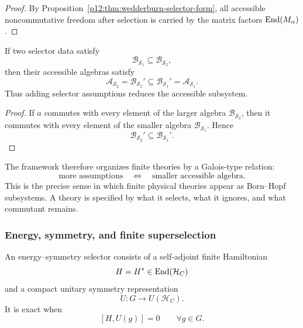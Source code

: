 \documentclass[12pt,a4paper]{article}
\begin{document}
\begin{proof}
By Proposition~\ref{p12:thm:wedderburn-selector-form}, all accessible noncommutative freedom after selection is carried by the matrix factors \(\operatorname{End}(M_\alpha)\).
\end{proof}

\begin{theorem}
\label{p12:thm:order-reversing-selector-lattice}
If two selector data satisfy
\[
\mathcal B_{\mathcal S_1}\subseteq\mathcal B_{\mathcal S_2},
\]
then their accessible algebras satisfy
\begin{equation}
\label{p12:eq:order-reversing-selector}
\mathcal A_{\mathcal S_2}
=
\mathcal B_{\mathcal S_2}'
\subseteq
\mathcal B_{\mathcal S_1}'
=
\mathcal A_{\mathcal S_1}.
\end{equation}
Thus adding selector assumptions reduces the accessible subsystem.
\end{theorem}

\begin{proof}
If \(a\) commutes with every element of the larger algebra \(\mathcal B_{\mathcal S_2}\), then it commutes with every element of the smaller algebra \(\mathcal B_{\mathcal S_1}\).  Hence
\[
\mathcal B_{\mathcal S_2}'\subseteq\mathcal B_{\mathcal S_1}'.
\]
\end{proof}

\begin{remark}
\label{p12:rem:subsystem-logic}
The framework therefore organizes finite theories by a Galois-type relation:
\[
\text{more assumptions}
\quad\Longleftrightarrow\quad
\text{smaller accessible algebra}.
\]
This is the precise sense in which finite physical theories appear as Born--Hopf subsystems.  A theory is specified by what it selects, what it ignores, and what commutant remains.
\end{remark}


\subsubsection{Energy, symmetry, and finite superselection}

\begin{definition}
\label{p12:def:energy-symmetry-selector}
An energy--symmetry selector consists of a self-adjoint finite Hamiltonian
\[
H=H^\ast\in\operatorname{End}(\mathcal H_C)
\]
and a compact unitary symmetry representation
\[
U:G\to U(\mathcal H_C).
\]
It is exact when
\begin{equation}
\label{p12:eq:exact-energy-symmetry}
[H,U(g)]=0
\qquad
\forall g\in G.
\end{equation}
\end{definition}
\end{document}
